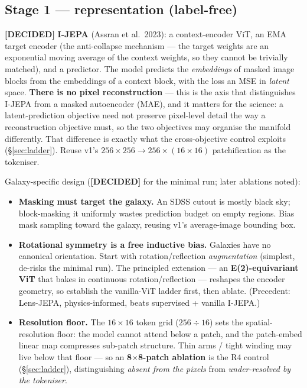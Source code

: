 \documentclass[11pt,a4paper]{article}
\newcommand{\dec}{\textcolor{decided}{\sffamily\bfseries[DECIDED]}}
\begin{document}
\subsection{Stage 1 --- representation (label-free)}

\dec{} \textbf{I-JEPA} (Assran et al.\ 2023): a context-encoder ViT, an EMA target encoder
(the anti-collapse mechanism --- the target weights are an exponential moving average of the
context weights, so they cannot be trivially matched), and a predictor. The model predicts the
\emph{embeddings} of masked image blocks from the embeddings of a context block, with the loss
an MSE in \emph{latent} space. \textbf{There is no pixel reconstruction} --- this is the axis
that distinguishes I-JEPA from a masked autoencoder (MAE), and it matters for the science: a
latent-prediction objective need not preserve pixel-level detail the way a reconstruction
objective must, so the two objectives may organise the manifold differently. That difference is
exactly what the cross-objective control exploits (\S\ref{sec:ladder}). Reuse v1's
$256{\times}256 \rightarrow 256\times(16{\times}16)$ patchification as the tokeniser.

Galaxy-specific design (\dec{} for the minimal run; later ablations noted):
\begin{itemize}[leftmargin=1.4em,itemsep=2pt]
\item \textbf{Masking must target the galaxy.} An SDSS cutout is mostly black sky; block-masking
it uniformly wastes prediction budget on empty regions. Bias mask sampling toward the galaxy,
reusing v1's average-image bounding box.
\item \textbf{Rotational symmetry is a free inductive bias.} Galaxies have no canonical
orientation. Start with rotation/reflection \emph{augmentation} (simplest, de-risks the minimal
run). The principled extension --- an \textbf{E(2)-equivariant ViT} that bakes in continuous
rotation/reflection --- reshapes the encoder geometry, so establish the vanilla-ViT ladder
first, then ablate. (Precedent: Lens-JEPA, physics-informed, beats supervised + vanilla I-JEPA.)
\item \textbf{Resolution floor.} The $16{\times}16$ token grid ($256 \div 16$) sets the
spatial-resolution floor: the model cannot attend below a patch, and the patch-embed linear map
compresses sub-patch structure. Thin arms / tight winding may live below that floor --- so an
\textbf{8$\times$8-patch ablation} is the R4 control (\S\ref{sec:ladder}), distinguishing
\emph{absent from the pixels} from \emph{under-resolved by the tokeniser}.
\end{itemize}
\end{document}
